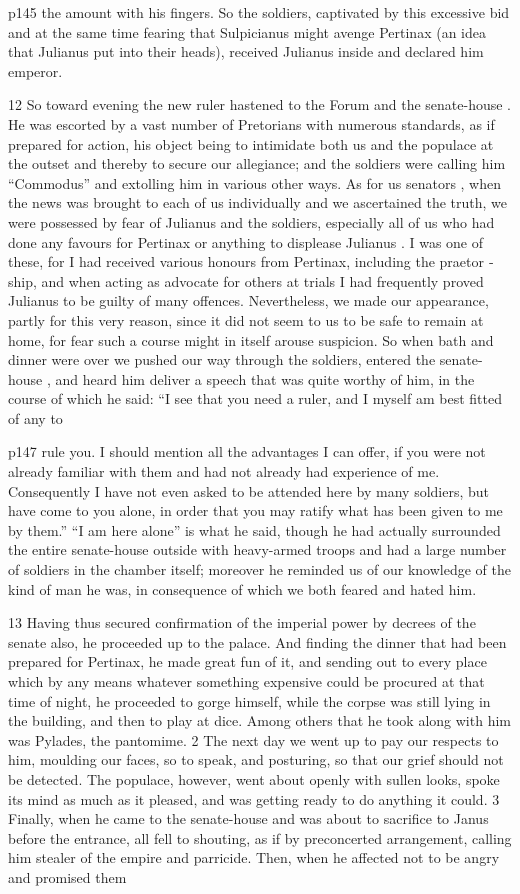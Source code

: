 p145 the amount with his fingers. So the soldiers, captivated by this excessive bid and at the same time fearing that Sulpicianus might avenge Pertinax (an idea that Julianus put into their heads), received Julianus inside and declared him emperor.

12
So toward evening the new ruler hastened to the Forum and the senate-house . He was escorted by a vast number of Pretorians with numerous standards, as if prepared for action, his object being to intimidate both us and the populace at the outset and thereby to secure our allegiance; and the soldiers were calling him ``Commodus'' and extolling him in various other ways. As for us senators , when the news was brought to each of us individually and we ascertained the truth, we were possessed by fear of Julianus and the soldiers, especially all of us who had done any favours for Pertinax or anything to displease Julianus . I was one of these, for I had received various honours from Pertinax, including the praetor ­ship, and when acting as advocate for others at trials I had frequently proved Julianus to be guilty of many offences. Nevertheless, we made our appearance, partly for this very reason, since it did not seem to us to be safe to remain at home, for fear such a course might in itself arouse suspicion. So when bath and dinner were over we pushed our way through the soldiers, entered the senate-house , and heard him deliver a speech that was quite worthy of him, in the course of which he said: ``I see that you need a ruler, and I myself am best fitted of any to

p147 rule you. I should mention all the advantages I can offer, if you were not already familiar with them and had not already had experience of me. Consequently I have not even asked to be attended here by many soldiers, but have come to you alone, in order that you may ratify what has been given to me by them.'' ``I am here alone'' is what he said, though he had actually surrounded the entire senate-house outside with heavy-armed troops and had a large number of soldiers in the chamber itself; moreover he reminded us of our knowledge of the kind of man he was, in consequence of which we both feared and hated him.

13
Having thus secured confirmation of the imperial power by decrees of the senate also, he proceeded up to the palace. And finding the dinner that had been prepared for Pertinax, he made great fun of it, and sending out to every place which by any means whatever something expensive could be procured at that time of night, he proceeded to gorge himself, while the corpse was still lying in the building, and then to play at dice. Among others that he took along with him was Pylades, the pantomime. 2 The next day we went up to pay our respects to him, moulding our faces, so to speak, and posturing, so that our grief should not be detected. The populace, however, went about openly with sullen looks, spoke its mind as much as it pleased, and was getting ready to do anything it could. 3 Finally, when he came to the senate-house and was about to sacrifice to Janus before the entrance, all fell to shouting, as if by preconcerted arrangement, calling him stealer of the empire and parricide. Then, when he affected not to be angry and promised them

